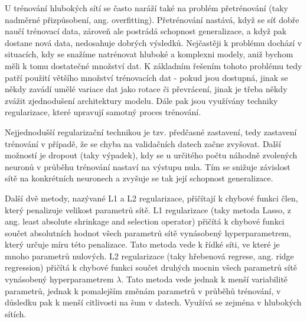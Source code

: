 U trénování hlubokých sítí se často naráží také na problém přetrénování (taky
nadměrné přizpůsobení, ang. overfitting). Přetrénování nastává, když se síť
dobře naučí trénovací data, zároveň ale postrádá schopnost generalizace, a když
pak dostane nová data, nedosahuje dobrých výsledků. Nejčastěji k problému
dochází v situacích, kdy se snažíme natrénovat hluboké a komplexni modely, aniž
bychom měli k tomu dostatečné množství dat. K základním řešením tohoto problému
tedy patří použití většího množství trénovacích dat - pokud jsou dostupná,
jinak se někdy zavádí umělé variace dat jako rotace či převrácení, jinak je
třeba někdy zvážit zjednodušení architektury modelu. Dále pak jsou využívány
techniky regularizace, které upravují samotný proces trénování.

Nejjednodušší regularizační technikou je tzv. předčasné zastavení, tedy
zastavení trénování v případě, že se chyba na validačních datech začne
zvyšovat. Další možností je dropout (taky výpadek), kdy se u určitého počtu
náhodně zvolených neuronů v průběhu trénování nastaví na výstupu nula. Tím se
snižuje závislost sítě na konkrétních neuronech a zvyšuje se tak její schopnost
generalizace.

Další dvě metody, nazývané L1 a L2 regularizace, přičítají k chybové funkci
člen, který penalizuje velikost parametrů sítě. L1 regularizace (taky metoda
Lasso, z ang. least absolute shrinkage and selection operator) přičítá k
chybové funkci součet absolutních hodnot všech parametrů sítě vynásobený
hyperparametrem, který určuje míru této penalizace. Tato metoda vede k řídké
síti, ve které je mnoho parametrů nulových. L2 regularizace (taky hřebenová
regrese, ang. ridge regression) přičítá k chybové funkci součet druhých mocnin
všech parametrů sítě vynásobený hyperparametrem $\lambda$. Tato metoda vede
jednak k menší variabilitě parametrů, jednak k pomalejším změnám parametrů v
průběhů trénování, v důsledku pak k menší citlivosti na šum v datech. Využívá
se zejména v hlubokých sítích.

\endinput